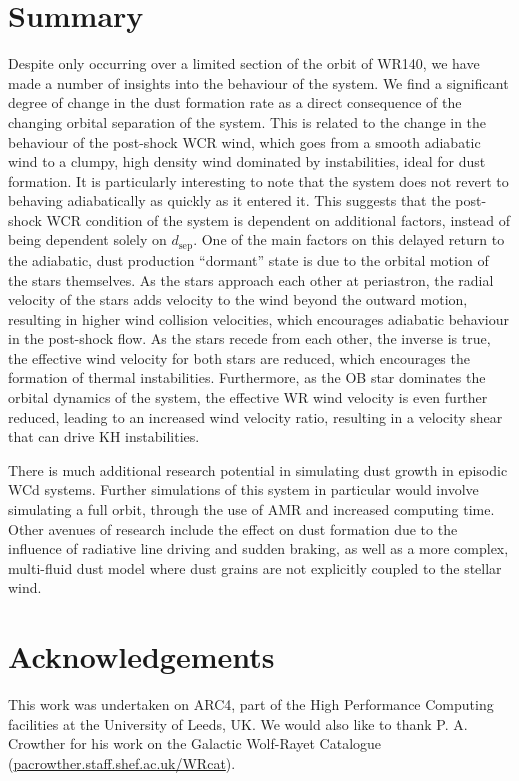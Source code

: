 \documentclass[fleqn,usenatbib]{mnras}
\newcommand{\rms}[1]{\ensuremath{_{\text{#1}}}}
\begin{document}
\section{Summary}
\label{sec:p2-conclusion}

Despite only occurring over a limited section of the orbit of WR140, we have made a number of insights into the behaviour of the system.
We find a significant degree of change in the dust formation rate as a direct consequence of the changing orbital separation of the system.
This is related to the change in the behaviour of the post-shock WCR wind, which goes from a smooth adiabatic wind to a clumpy, high density wind dominated by instabilities, ideal for dust formation.
It is particularly interesting to note that the system does not revert to behaving adiabatically as quickly as it entered it.
This suggests that the post-shock WCR condition of the system is dependent on additional factors, instead of being dependent solely on $d\rms{sep}$.
One of the main factors on this delayed return to the adiabatic, dust production ``dormant'' state is due to the orbital motion of the stars themselves.
As the stars approach each other at periastron, the radial velocity of the stars adds velocity to the wind beyond the outward motion, resulting in higher wind collision velocities, which encourages adiabatic behaviour in the post-shock flow.
As the stars recede from each other, the inverse is true, the effective wind velocity for both stars are reduced, which encourages the formation of thermal instabilities.
Furthermore, as the OB star dominates the orbital dynamics of the system, the effective WR wind velocity is even further reduced, leading to an increased wind velocity ratio, resulting in a velocity shear that can drive KH instabilities.

There is much additional research potential in simulating dust growth in episodic WCd systems.
Further simulations of this system in particular would involve simulating a full orbit, through the use of AMR and increased computing time.
Other avenues of research include the effect on dust formation due to the influence of radiative line driving and sudden braking, as well as a more complex, multi-fluid dust model where dust grains are not explicitly coupled to the stellar wind.

\section{Acknowledgements}

This work was undertaken on ARC4, part of the High Performance Computing facilities at the University of Leeds, UK.
We would also like to thank P. A. Crowther for his work on the Galactic Wolf-Rayet Catalogue (\url{pacrowther.staff.shef.ac.uk/WRcat}).





\bsp	%
\label{lastpage}
\end{document}
